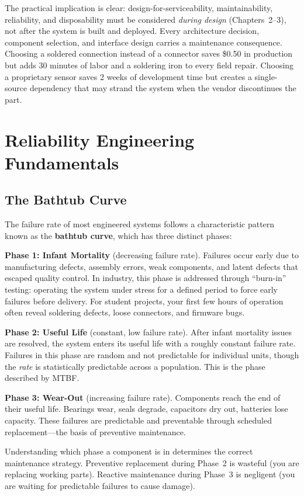 \documentclass[11pt,letterpaper,twoside,openany]{book}
\begin{document}
The practical implication is clear: design-for-serviceability, maintainability, reliability, and disposability must be considered \emph{during design} (Chapters~2--3), not after the system is built and deployed. Every architecture decision, component selection, and interface design carries a maintenance consequence. Choosing a soldered connection instead of a connector saves \$0.50 in production but adds 30 minutes of labor and a soldering iron to every field repair. Choosing a proprietary sensor saves 2 weeks of development time but creates a single-source dependency that may strand the system when the vendor discontinues the part.

\FloatBarrier
\section{Reliability Engineering Fundamentals}

\subsection{The Bathtub Curve}
The failure rate of most engineered systems follows a characteristic pattern known as the \textbf{bathtub curve}, which has three distinct phases:

\textbf{Phase 1: Infant Mortality} (decreasing failure rate). Failures occur early due to manufacturing defects, assembly errors, weak components, and latent defects that escaped quality control. In industry, this phase is addressed through ``burn-in'' testing: operating the system under stress for a defined period to force early failures before delivery. For student projects, your first few hours of operation often reveal soldering defects, loose connectors, and firmware bugs.

\textbf{Phase 2: Useful Life} (constant, low failure rate). After infant mortality issues are resolved, the system enters its useful life with a roughly constant failure rate. Failures in this phase are random and not predictable for individual units, though the \emph{rate} is statistically predictable across a population. This is the phase described by MTBF.

\textbf{Phase 3: Wear-Out} (increasing failure rate). Components reach the end of their useful life. Bearings wear, seals degrade, capacitors dry out, batteries lose capacity. These failures are predictable and preventable through scheduled replacement---the basis of preventive maintenance.

Understanding which phase a component is in determines the correct maintenance strategy. Preventive replacement during Phase~2 is wasteful (you are replacing working parts). Reactive maintenance during Phase~3 is negligent (you are waiting for predictable failures to cause damage).
\end{document}
